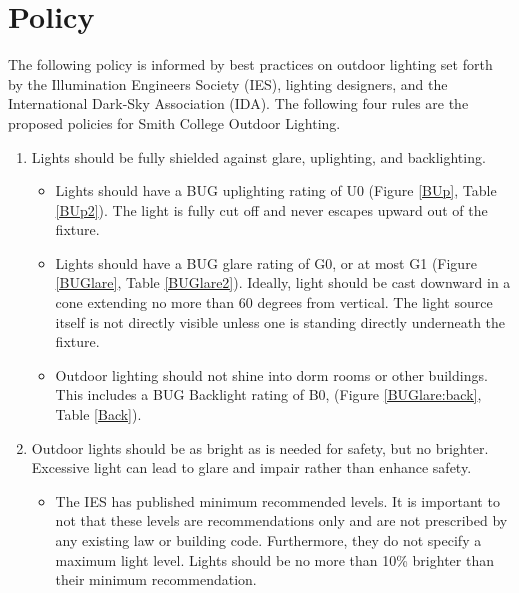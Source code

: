 \documentclass[12pt, oneside]{article}
\begin{document}
\section{Policy}
The following policy is informed by best practices on outdoor lighting set forth by the Illumination Engineers Society (IES), lighting designers, and the International Dark-Sky Association (IDA). The following four rules are the proposed policies for Smith College Outdoor Lighting. 

\begin{enumerate}
\item Lights should be fully shielded against glare, uplighting, and backlighting.
\begin{itemize}
\item Lights should have a BUG uplighting rating of U0 (Figure \ref{BUp}, Table \ref{BUp2}). The light is fully cut off and never escapes upward out of the fixture. 
\item Lights should have a BUG glare rating of G0, or at most G1 (Figure \ref{BUGlare}, Table \ref{BUGlare2}). Ideally, light should be cast downward in a cone extending no more than 60 degrees from vertical. The light source itself is not directly visible unless one is standing directly underneath the fixture.
\item Outdoor lighting should not shine into dorm rooms or other buildings. This includes a BUG Backlight rating of B0, (Figure \ref{BUGlare:back}, Table \ref{Back}).
\end{itemize}
\item Outdoor lights should be as bright as is needed for safety, but no brighter. Excessive light can lead to glare and impair rather than enhance safety. 
\begin{itemize}
\item The IES has published minimum recommended levels. 
It is important to not that these levels are recommendations only and are not prescribed by any existing law or building code. Furthermore, they do not specify a maximum light level. Lights should be no more than 10\% brighter than their minimum recommendation.
\begin{table}[p]
\begin{center}


\end{center}
\end{table}
\end{itemize}
\end{enumerate}
\end{document}
